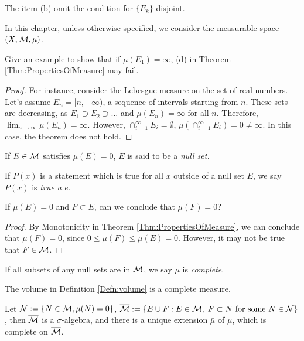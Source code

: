 \begin{rem}
    The item (b) omit the condition 
    for $\{E_{k}\}$ disjoint. 
\end{rem}
\begin{rem}
    In this chapter, 
    unless otherwise specified, 
    we consider the measurable space 
    $(X,\mathcal{M},\mu)$.
\end{rem}
\begin{exc}
    Give an example to show that 
    if $\mu(E_1)=\infty$, 
    (d) in Theorem \ref{Thm:PropertiesOfMeasure} may fail. 
\end{exc}
\begin{proof}
    For instance, consider the Lebesgue measure on the set of real numbers. 
    Let's assume $E_n=[n,+\infty)$,
    a sequence of intervals starting from $n$.
    These sets are decreasing, as 
    $E_1\supset E_2\supset\ldots$ and $\mu(E_n)=\infty$ for all $n$.
    Therefore, $\lim_{n\rightarrow\infty}\mu(E_n)=\infty$.
    However, $\cap_{i=1}^{\infty}E_{i}=\emptyset$, 
    $\mu(\cap_{i=1}^{\infty}E_{i})=0\neq\infty$.
    In this case, the theorem does not hold.
\end{proof}
\begin{defn}
    \label{Defn:NullSet}
    If $E\in\mathcal{M}$ satisfies $\mu(E)=0$, $E$ 
    is said to be a \textit{null set.}
\end{defn}
\begin{defn}
    \label{Defn:Trueae}
    If $P(x)$ is a statement which is true 
    for all $x$ outside of a null set $E$, 
    we say $P(x)$ is \textit{true a.e.}
\end{defn}
\begin{exc}
    If $\mu(E)=0$ and $F\subset E$, 
    can we conclude that $\mu(F)=0$? 
\end{exc}
\begin{proof}
    By Monotonicity in Theorem \ref{Thm:PropertiesOfMeasure},
    we can conclude that $\mu(F)=0$,
    since $0\leq\mu(F)\leq\mu(E)=0$.
    However, it may not be true that $F\in\mathcal{M}$. 
\end{proof}
\begin{defn}
    \label{Defn:CompleteMeas}
    If all subsets of any null sets are 
    in $\mathcal{M}$, we say $\mu$ is \textit{complete}.
\end{defn}
\begin{exm}
    The volume in Definition \ref{Defn:volume} 
    is a complete measure.
\end{exm}
\begin{thm}
    \label{Thm:CompletationForMeas}
    Let $\mathcal{N}:=\{N\in\mathcal{M},\mu(N)=0\}$, 
    $\overline{\mathcal{M}}:=\{E\cup F:E\in\mathcal{M},\; 
    F\subset N\text{ for some }N\in\mathcal{N}\}$, 
    then $\overline{\mathcal{M}}$ is a $\sigma$-algebra, 
    and there is a unique 
    extension $\bar{\mu}$ of $\mu$, 
    which is complete on $\overline{\mathcal{M}}$.
\end{thm}
